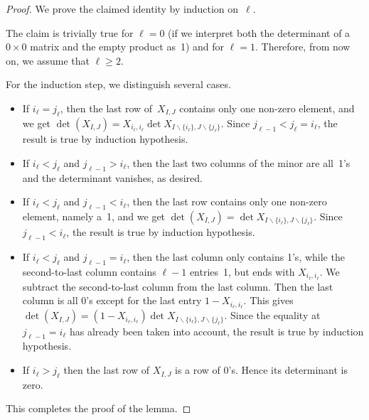 \documentclass[12pt,reqno]{amsart}
\numberwithin{equation}{section}
\theoremstyle{definition}
\theoremstyle{remark}
\begin{document}
\begin{proof}
We prove the claimed identity by induction on~$\ell$.

The claim is trivially true for $\ell=0$ (if we interpret both the
determinant of a $0\times0$ matrix and the empty product as~1)
and for $\ell=1$. Therefore, from now on, we assume that $\ell\ge2$.

For the induction step, we distinguish several cases.

\begin{itemize}
\item If $i_\ell= j_\ell$, then the last row of~$X_{I,J}$ 
contains only one non-zero element,
and we get $\det(X_{I,J}) = X_{ i_\ell ,i_\ell}
\det X_{ I\backslash
\{ i_\ell \}, J\backslash \{ j_\ell \} }$.
Since $j_{\ell-1} < j_\ell = i_\ell$,
the result is true by induction hypothesis. 
\item
If $i_\ell < j_\ell$ and $j_{\ell-1} > i_\ell $, then the last two
columns of the minor are all~1's and the determinant vanishes, as
desired.
\item
If $i_\ell < j_\ell$ and $j_{\ell-1} < i_\ell $, then the last row
contains only one non-zero element, namely a~1, and we get $\det(X_{I,J}) =
\det X_{I\backslash \{ i_\ell \}, J\backslash \{ j_\ell \} }$.
Since $j_{\ell-1} < i_\ell $, the
result is true by induction hypothesis. 
\item
If $i_\ell < j_\ell$ and $j_{\ell-1} = i_\ell $, then the last column
only contains 1's, while the second-to-last column contains $\ell-1$
entries~1, but ends with $X_{ i_\ell, i_\ell }$. We subtract the
second-to-last column from the last column. Then the last column is
all 0's except for the last entry $1 - X_{ i_\ell ,i_\ell }$. This gives
$\det(X_{I,J}) = (1 - X_{ i_\ell, i_\ell })
\det X_{ I\backslash \{ i_\ell \}, J\backslash \{ j
_\ell \}}$. Since the equality at $j_{\ell-1} = i_\ell$
has already been
taken into account, the result is true by induction hypothesis. 
\item
If $i_\ell > j_\ell$ then the last row of $X_{I,J}$ is a row of 0's.
Hence its determinant is zero.
\end{itemize}
This completes the proof of the lemma.
\end{proof}
\end{document}
